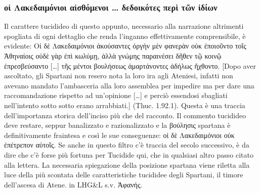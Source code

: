 {            \subsubsection{\textgreek{οἱ Λακεδαιμόνιοι αἰσθόμενοι … δεδοικότες περὶ τῶν ἰδίων}}
            Il carattere tucidideo di questo appunto, necessario alla narrazione altrimenti spogliata di ogni dettaglio che renda l'inganno effettivamente comprensibile, è evidente: \textgreek{Οἱ δὲ Λακεδαιμόνιοι ἀκούσαντες ὀργὴν μὲν φανερὰν οὐκ ἐποιοῦντο τοῖς Ἀθηναίοις οὐδὲ γὰρ ἐπὶ κωλύμῃ, ἀλλὰ γνώμης παραινέσει δῆθεν τῷ κοινῷ ἐπρεσβεύσαντο […] τῆς μέντοι βουλήσεως ἁμαρτάνοντες ἀδήλως ἤχθοντο.} [Dopo aver ascoltato, gli Spartani non resero nota la loro ira agli Ateniesi, infatti non avevano mandato l'ambasceria alla loro assemblea per impedire ma per dare una raccomandazione rispetto ad un'opinione […] e perciò essendosi sbagliati nell'intento sotto sotto erano arrabbiati.] (Thuc. 1.92.1). Questa è una traccia dell'importanza storica dell'inciso più che del racconto. Il commento tucidideo deve restare, seppur banalizzato e razionalizzato e la \textgreek{βούλησις} spartana è definitivamente fraintesa e così le sue conseguenze: \textgreek{οἱ δὲ Λακεδαιμόνιοι οὐκ ἐπέτρεπον αὐτοῖς}. Se anche in questo filtro c'è traccia del secolo successivo,  è da dire che c'è forse più fortuna per Tucidide qui, che in qualsiasi altro passo citato alla lettera. La necessaria spiegazione della posizione spartana viene riletta alla luce della più scontata delle caratteristiche tucididee degli Spartani, il timore dell'ascesa di Atene. \cite{Vattuone2007} in LHG\&L s.v. \textgreek{Ἀφανής}.
}
